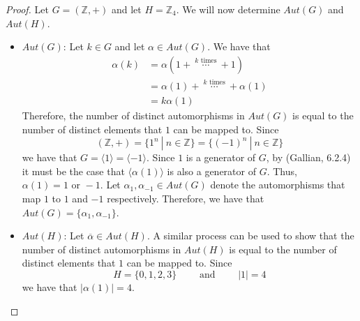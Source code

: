 \documentclass[12pt,reqno]{article}
\newcommand{\Z}{\mathbb{Z}}
\theoremstyle{plain}
\theoremstyle{definition}
\begin{document}
\begin{proof}
    Let \(G=(\Z, +)\) and let \(H=\Z_4\). We will now determine \(Aut(G)\) and \(Aut(H)\).
    \begin{itemize}
        \item \underline{\(Aut(G)\)}: Let \(k\in G\) and let \(\alpha\in Aut(G)\). We have that
        \begin{align*}
            \alpha(k)&=\alpha(1+\ \overset{k\text{ times}}{\cdots}\ +1)\\
            &=\alpha(1)+\ \overset{k\text{ times}}{\cdots}\ +\alpha(1)\\
            &=k\alpha(1)
        \end{align*}
        Therefore, the number of distinct automorphisms
        in \(Aut(G)\) is equal to the number of distinct elements that \(1\) can be mapped to.
        Since \[(\Z,+)=\{1^n\ |\ n\in\Z\}=\{(-1)^n\ |\ n\in\Z\}\]
        we have that \(G=\langle 1\rangle=\langle -1\rangle\). Since \(1\) is a generator of \(G\), by (Gallian, 6.2.4) it must be the case
        that \(\langle\alpha(1)\rangle\) is also a generator of \(G\). Thus, \(\alpha(1)=1\text{ or }-1\). Let \(\alpha_1,\alpha_{-1}\in Aut(G)\)
        denote the automorphisms that map \(1\) to \(1\) and \(-1\) respectively. Therefore, we have that
        \(Aut(G)=\{\alpha_1,\alpha_{-1}\}\).

        \item \underline{\(Aut(H)\)}: Let \(\overline{\alpha}\in Aut(H)\). A similar process can be used to show that the number of distinct automorphisms
        in \(Aut(H)\) is equal to the number of distinct elements that \(1\) can be mapped to. Since
        \[H=\{0,1,2,3\}\qquad\text{ and }\qquad |1|=4\]
        we have that \(|\alpha(1)|=4\).
    \end{itemize}
\end{proof}
\end{document}
